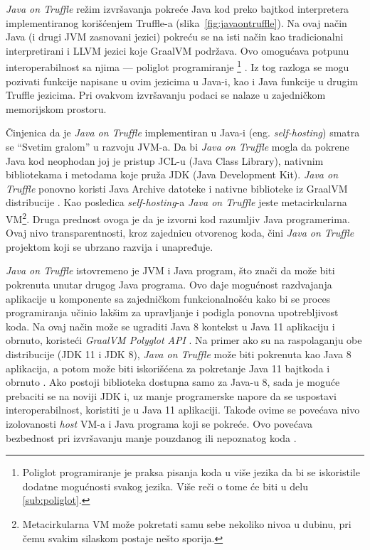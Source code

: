 \documentclass[a4paper]{article}
\begin{document}
\emph{Java on Truffle} režim izvršavanja pokreće Java kod preko bajtkod interpretera implementiranog korišćenjem Truffle-a (slika~\ref{fig:javaontruffle}). Na ovaj način Java (i drugi JVM zasnovani jezici) pokreću se na isti način kao tradicionalni interpretirani i LLVM jezici koje GraalVM podržava. Ovo omogućava potpunu interoperabilnost sa njima --- poliglot programiranje \footnote{Poliglot programiranje je praksa pisanja koda u više jezika da bi se iskoristile dodatne mogućnosti svakog jezika. Više reči o tome će biti u delu \ref{sub:poliglot}.} \cite{grooteman2017java, graalvm}. Iz tog razloga se mogu pozivati funkcije napisane u ovim jezicima u Java-i, kao i Java funkcije u drugim Truffle jezicima. Pri ovakvom izvršavanju podaci se nalaze u zajedničkom memorijskom prostoru.

Činjenica da je \emph{Java on Truffle} implementiran u Java-i (eng. \emph{self-hosting}) smatra se ``Svetim gralom'' u razvoju JVM-a. Da bi \emph{Java on Truffle} mogla da pokrene Java kod neophodan joj je pristup JCL-u (Java Class Library), nativnim bibliotekama i metodama koje pruža JDK (Java Development Kit). \emph{Java on Truffle} ponovno koristi Java Archive datoteke i nativne biblioteke iz GraalVM distribucije \cite{grooteman2017java}. Kao posledica \emph{self-hosting}-a \emph{Java on Truffle} jeste metacirkularna VM\footnote{Metacirkularna VM može pokretati samu sebe nekoliko nivoa u dubinu, pri čemu svakim silaskom postaje nešto sporija.}. Druga prednost ovoga je da je izvorni kod razumljiv Java programerima. Ovaj nivo transparentnosti, kroz zajednicu otvorenog koda, čini \emph{Java on Truffle} projektom koji se ubrzano razvija i unapređuje.

\emph{Java on Truffle} istovremeno je JVM i Java program, što znači da može biti pokrenuta unutar drugog Java programa. Ovo daje mogućnost razdvajanja aplikacije u komponente sa zajedničkom funkcionalnošću kako bi se proces programiranja učinio lakšim za upravljanje i podigla ponovna upotrebljivost koda. Na ovaj način može se ugraditi Java 8 kontekst u Java 11 aplikaciju i obrnuto, koristeći \emph{GraalVM Polyglot API} \cite{graalvm}. Na primer ako su na raspolaganju obe distribucije (JDK 11 i JDK 8),
\emph{Java on Truffle} može biti pokrenuta kao Java 8 aplikacija, a potom može biti iskorišćena za pokretanje Java 11 bajtkoda i obrnuto \cite{grooteman2017java}. Ako postoji biblioteka dostupna samo za Java-u 8, sada je moguće prebaciti se na noviji JDK i, uz manje programerske napore da se uspostavi interoperabilnost, koristiti je u Java 11 aplikaciji. Takođe ovime se povećava nivo izolovanosti \emph{host} VM-a i Java programa koji se pokreće. Ovo povećava bezbednost pri izvršavanju manje pouzdanog ili nepoznatog koda \cite{graalvm}.
\end{document}
